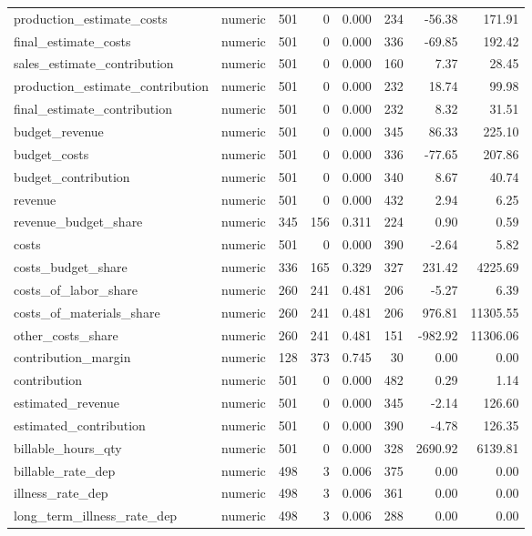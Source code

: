 \begin{landscape}
\begin{longtable}[t]{llrrrrrr}
production\_estimate\_costs & numeric & 501 & 0 & 0.000 & 234 & -56.38 & 171.91\\
final\_estimate\_costs & numeric & 501 & 0 & 0.000 & 336 & -69.85 & 192.42\\
sales\_estimate\_contribution & numeric & 501 & 0 & 0.000 & 160 & 7.37 & 28.45\\
production\_estimate\_contribution & numeric & 501 & 0 & 0.000 & 232 & 18.74 & 99.98\\
final\_estimate\_contribution & numeric & 501 & 0 & 0.000 & 232 & 8.32 & 31.51\\
budget\_revenue & numeric & 501 & 0 & 0.000 & 345 & 86.33 & 225.10\\
budget\_costs & numeric & 501 & 0 & 0.000 & 336 & -77.65 & 207.86\\
budget\_contribution & numeric & 501 & 0 & 0.000 & 340 & 8.67 & 40.74\\
revenue & numeric & 501 & 0 & 0.000 & 432 & 2.94 & 6.25\\
revenue\_budget\_share & numeric & 345 & 156 & 0.311 & 224 & 0.90 & 0.59\\
costs & numeric & 501 & 0 & 0.000 & 390 & -2.64 & 5.82\\
costs\_budget\_share & numeric & 336 & 165 & 0.329 & 327 & 231.42 & 4225.69\\
costs\_of\_labor\_share & numeric & 260 & 241 & 0.481 & 206 & -5.27 & 6.39\\
costs\_of\_materials\_share & numeric & 260 & 241 & 0.481 & 206 & 976.81 & 11305.55\\
other\_costs\_share & numeric & 260 & 241 & 0.481 & 151 & -982.92 & 11306.06\\
contribution\_margin & numeric & 128 & 373 & 0.745 & 30 & 0.00 & 0.00\\
contribution & numeric & 501 & 0 & 0.000 & 482 & 0.29 & 1.14\\
estimated\_revenue & numeric & 501 & 0 & 0.000 & 345 & -2.14 & 126.60\\
estimated\_contribution & numeric & 501 & 0 & 0.000 & 390 & -4.78 & 126.35\\
billable\_hours\_qty & numeric & 501 & 0 & 0.000 & 328 & 2690.92 & 6139.81\\
billable\_rate\_dep & numeric & 498 & 3 & 0.006 & 375 & 0.00 & 0.00\\
illness\_rate\_dep & numeric & 498 & 3 & 0.006 & 361 & 0.00 & 0.00\\
long\_term\_illness\_rate\_dep & numeric & 498 & 3 & 0.006 & 288 & 0.00 & 0.00\\

\end{longtable}
\end{landscape}
